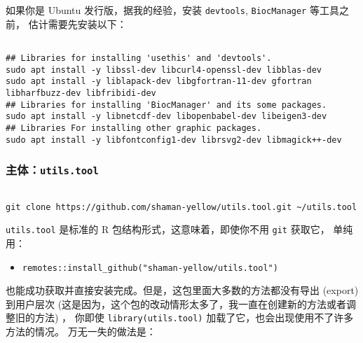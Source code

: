 \documentclass[
]{article}
\providecommand{\tightlist}{%
  \setlength{\itemsep}{0pt}\setlength{\parskip}{0pt}}
\begin{document}
如果你是 Ubuntu 发行版，据我的经验，安装 \texttt{devtools}, \texttt{BiocManager} 等工具之前，
估计需要先安装以下：

\begin{tcolorbox}[colback = gray!10, colframe = red!50, width = 16cm, arc = 1mm, auto outer arc, title = {Bash input}]
\begin{verbatim}

## Libraries for installing 'usethis' and 'devtools'.
sudo apt install -y libssl-dev libcurl4-openssl-dev libblas-dev
sudo apt install -y liblapack-dev libgfortran-11-dev gfortran libharfbuzz-dev libfribidi-dev
## Libraries for installing 'BiocManager' and its some packages.
sudo apt install -y libnetcdf-dev libopenbabel-dev libeigen3-dev
## Libraries For installing other graphic packages.
sudo apt install -y libfontconfig1-dev librsvg2-dev libmagick++-dev

\end{verbatim}
\end{tcolorbox}

\hypertarget{git}{%
\subsubsection{\texorpdfstring{主体：\texttt{utils.tool}}{主体：utils.tool}}\label{git}}

\begin{tcolorbox}[colback = gray!10, colframe = red!50, width = 16cm, arc = 1mm, auto outer arc, title = {Bash input}]
\begin{verbatim}

git clone https://github.com/shaman-yellow/utils.tool.git ~/utils.tool

\end{verbatim}
\end{tcolorbox}

\texttt{utils.tool} 是标准的 R 包结构形式，这意味着，即使你不用 \texttt{git} 获取它，
单纯用：

\begin{itemize}
\tightlist
\item
  \texttt{remotes::install\_github("shaman-yellow/utils.tool")}
\end{itemize}

也能成功获取并直接安装完成。但是，这包里面大多数的方法都没有导出 (export) 到用户层次
(这是因为，这个包的改动情形太多了，我一直在创建新的方法或者调整旧的方法) ，
你即使 \texttt{library(utils.tool)} 加载了它，也会出现使用不了许多方法的情况。
万无一失的做法是：
\end{document}
